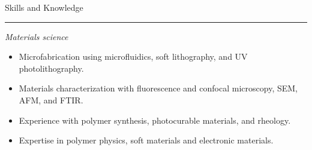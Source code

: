 \documentclass[10pt]{article}
\newcommand{\bigsection}[1]{	
	\vspace{4pt}
	{\fontfamily{phv}\selectfont\Large#1}

	\vspace{-10pt} \rule{\textwidth}{1pt}
}
\begin{document}


\bigsection{Skills and Knowledge}

\vspace{-10pt}

\textit{Materials science}
\begin{itemize}\setlength{\itemsep}{0cm}
  \setlength{\parskip}{0cm}

		\item Microfabrication using microfluidics, soft lithography, and UV photolithography.
		\item Materials characterization with fluorescence and confocal microscopy, SEM, AFM, and FTIR.
		\item Experience with polymer synthesis, photocurable materials, and rheology.
		\item Expertise in polymer physics, soft materials and electronic materials.
\end{itemize}
\end{document}
